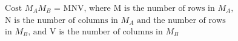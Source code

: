 \documentclass[preview]{standalone}
\begin{document}
\begin{center}
\begin{align*}& \text{Cost }M_{A} M_{B} \text{ = MNV, where M is the number of rows in } M_A \text{,} \\ &\text{N is the number of columns in } M_{A} \text{ and the number of rows} \\&\text{in } M_B \text{, and V is the number of columns in } M_B\end{align*}
\end{center}
\end{document}
